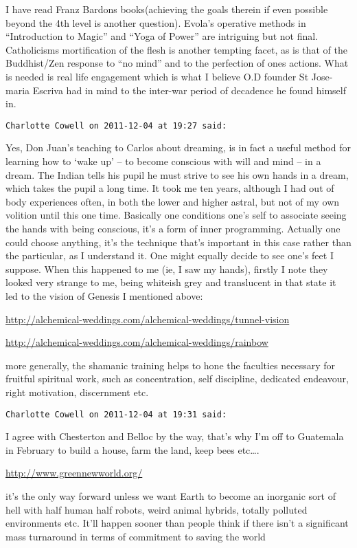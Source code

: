 \begin{footnotesize}
\begin{sffamily}
I have read Franz Bardons books(achieving the goals therein if even possible beyond the 4th level is another question). Evola's operative methods in ``Introduction to Magic'' and ``Yoga of Power'' are intriguing but not final. Catholicisms mortification of the flesh is another tempting facet, as is that of the Buddhist/Zen response to ``no mind'' and to the perfection of ones actions. What is needed is real life engagement which is what I believe O.D founder St Jose-maria Escriva had in mind to the inter-war period of decadence he found himself in.


\hfill

\texttt{Charlotte Cowell on 2011-12-04 at 19:27 said: }

Yes, Don Juan's teaching to Carlos about dreaming, is in fact a useful method for learning how to `wake up’ – to become conscious with will and mind – in a dream. The Indian tells his pupil he must strive to see his own hands in a dream, which takes the pupil a long time. It took me ten years, although I had out of body experiences often, in both the lower and higher astral, but not of my own volition until this one time. Basically one conditions one's self to associate seeing the hands with being conscious, it's a form of inner programming. Actually one could choose anything, it's the technique that's important in this case rather than the particular, as I understand it. One might equally decide to see one's feet I suppose. When this happened to me (ie, I saw my hands), firstly I note they looked very strange to me, being whiteish grey and translucent in that state it led to the vision of Genesis I mentioned above: 

\url{http://alchemical-weddings.com/alchemical-weddings/tunnel-vision}

\url{http://alchemical-weddings.com/alchemical-weddings/rainbow}

more generally, the shamanic training helps to hone the faculties necessary for fruitful spiritual work, such as concentration, self discipline, dedicated endeavour, right motivation, discernment etc.


\hfill

\texttt{Charlotte Cowell on 2011-12-04 at 19:31 said: }

I agree with Chesterton and Belloc by the way, that's why I'm off to Guatemala in February to build a house, farm the land, keep bees etc….

\url{http://www.greennewworld.org/}

it's the only way forward unless we want Earth to become an inorganic sort of hell with half human half robots, weird animal hybrids, totally polluted environments etc. It'll happen sooner than people think if there isn't a significant mass turnaround in terms of commitment to saving the world



\end{sffamily}
\end{footnotesize}
